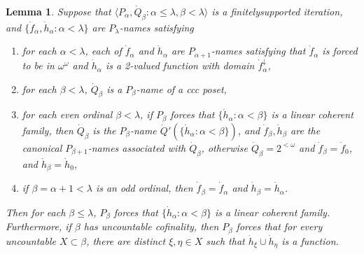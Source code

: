 \documentclass{amsart}
\newtheorem{lemma}[thm]{Lemma}
\theoremstyle{definition}
\theoremstyle{remark}
\begin{document}
\begin{lemma}  Suppose that $\langle P_\alpha, \dot Q_\beta : \alpha \leq \lambda,
\beta <\lambda\rangle$ is a finitely\label{cohere} supported iteration,
and $\{ \dot f_\alpha , \dot h_\alpha : \alpha < \lambda \}$ are
 $P_\lambda$-names 
satisfying
\begin{enumerate}
\item for each $\alpha<\lambda$, each of $\dot f_\alpha$ and 
 $\dot h_\alpha$ are $P_{\alpha+1}$-names  satisfying that $\dot f_\alpha$
 is forced to be in $\omega^\omega$ and $\dot h_\alpha$ is a 2-valued
 function with domain $\dot f_\alpha^\downarrow$,
\item for each $\beta<\lambda$, $\dot Q_\beta$ is a $P_\beta$-name of a ccc poset,
\item for each even ordinal $\beta<\lambda$, if $P_\beta$ forces
that $\{ \dot h_\alpha : \alpha < \beta \}$ 
is a linear coherent family, then $\dot Q_\beta$ is 
the $P_\beta$-name  $\dot Q'(\{\dot h_\alpha : \alpha <\beta \})$,
and $\dot f_\beta, \dot h_\beta$ are the canonical $P_{\beta+1}$-names
 associated with $\dot Q_\beta$, otherwise $\dot Q_\beta = 2^{<\omega}$ and
 $\dot f_\beta=\dot f_0$,
 and $\dot h_\beta = \dot h_0$,
 \item if $\beta=\alpha+1<\lambda$ is an odd ordinal, then $\dot f_\beta=\dot f_\alpha$
 and $\dot h_\beta = \dot h_\alpha$.
 \end{enumerate}
Then for each $\beta \leq \lambda$, $P_\beta$ forces
that $\{ \dot h_\alpha : \alpha < \beta \}$ is
a linear coherent family. Furthermore, if $\beta$ has uncountable cofinality,
 then $P_\beta$ forces that for every uncountable $X\subset \beta$,
  there are distinct $\xi,\eta\in X$ such that
   $\dot h_\xi\cup \dot h_\eta$ is a function.
\end{lemma}
\end{document}
